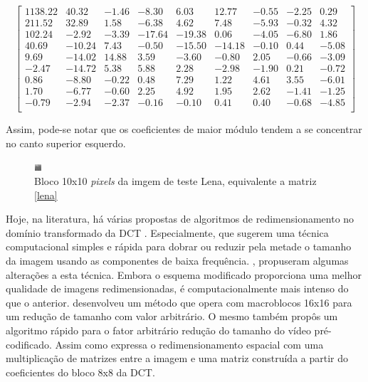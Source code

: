 \begin{center}
	\begin{equation}
\begin{bmatrix}
1138.22&	40.32&	-1.46&	-8.30&	6.03&	12.77&	-0.55&	-2.25&	0.29\\
211.52&	32.89&	1.58&	-6.38&	4.62&	7.48&	-5.93&	-0.32&	4.32\\
102.24&	-2.92&	-3.39&	-17.64&	-19.38&	0.06&	-4.05&	-6.80&	1.86\\	
40.69&	-10.24&	7.43&	-0.50&	-15.50&	-14.18&	-0.10&	0.44&	-5.08\\	
9.69&	-14.02&	14.88&	3.59&	-3.60&	-0.80&	2.05&	-0.66&	-3.09\\
-2.47&	-14.72&	5.38&	5.88&	2.28&	-2.98&	-1.90&	0.21&	-0.72\\
0.86&	-8.80&	-0.22&	0.48&	7.29&	1.22&	4.61&	3.55&	-6.01\\
1.70&	-6.77&	-0.60&	2.25&	4.92&	1.95&	2.62&	-1.41&	-1.25\\
-0.79&	-2.94&	-2.37&	-0.16&	-0.10&	0.41&	0.40&	-0.68&	-4.85\\
\end{bmatrix}	
	\end{equation}
\end{center}

\noindent Assim, pode-se notar que os coeficientes de maior módulo tendem a se concentrar no canto superior esquerdo. 

\begin{figure}[h]
	\centering
	\includegraphics[scale=4]{figuras/BLOCO.png}
	\caption{Bloco 10x10 \textit{pixels} da imgem de teste Lena, equivalente a matriz \ref{lena}}
	\label{PEDACO_LENA}
\end{figure}

Hoje, na literatura, há várias propostas de algoritmos de redimensionamento no domínio transformado da DCT \cite{patil2006fast2,chang1995manipulation,wang2010adaptive}. Especialmente, \cite{dugad2001fast} que sugerem uma técnica computacional simples e rápida para dobrar ou reduzir pela metade o tamanho da imagem usando as componentes de baixa frequência. \cite{mukherjee2002image}, propuseram algumas alterações a esta técnica. Embora o esquema modificado proporciona uma melhor qualidade de imagens redimensionadas, é computacionalmente mais intenso do que o anterior. \cite{patil2006fast2} desenvolveu um método que opera com macroblocos 16x16 para um redução de tamanho com valor arbitrário. O mesmo também propôs um algoritmo rápido para o fator arbitrário redução do tamanho do vídeo pré-codificado. Assim como expressa o redimensionamento espacial com uma multiplicação de matrizes entre a imagem e uma matriz construída a partir do coeficientes do bloco 8x8 da DCT.

